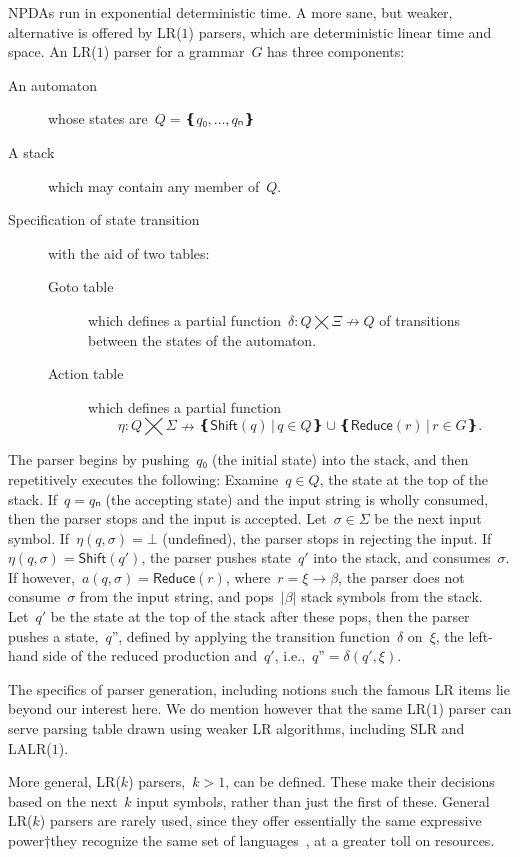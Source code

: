 NPDAs run in exponential deterministic time.
A more sane, but weaker, alternative is offered by LR($1$) parsers,
  which are deterministic linear time and space.
An LR($1$) parser for a grammar~$G$ has three components:
\begin{description}
  \item[An automaton] whose states are~$Q=❴q₀,…,qₙ❵$
  \item[A stack] which may contain any member of~$Q$.
  \item[Specification of state transition] with the aid of two tables:
        \begin{description}
          \item[Goto table] which defines a partial function~$δ:Q⨉Ξ↛Q$ of transitions
          between the states of the automaton.
          \item[Action table] which
            defines a partial function\[η:Q⨉Σ↛ ❴ \textsf{Shift}(q) \,|\, q∈Q❵ ∪ ❴\textsf{Reduce}(r) \,| \, r∈G❵.\]
        \end{description}
\end{description}
The parser begins by pushing~$q₀$ (the initial state) into the stack,
and then repetitively executes the following:
Examine~$q∈Q$, the state at the top of the stack.
If~$q=qₙ$ (the accepting state) and the input string is wholly consumed, then the parser stops and the input is accepted.
Let~$σ∈Σ$ be the next input symbol.
If~$η(q,σ)=⊥$ (undefined), the parser stops in rejecting the input.
If~$η(q,σ) = \textsf{Shift}(q')$, the parser pushes state~$q'$ into the stack, and consumes~$σ$.
If however,~$a(q,σ) = \textsf{Reduce}(r)$,
where~$r=ξ→β$, the parser does not consume~$σ$ from the input string,
  and pops~$|β|$ stack symbols from the stack.
Let~$q'$ be the state at the top of the stack after these pops, then
  the parser pushes a state,~$q”$,
  defined by applying the transition function~$δ$ on~$ξ$, the left-hand side of the reduced production and~$q'$, i.e.,~$q”=δ(q',ξ)$.

The specifics of parser generation, including notions such the famous LR items lie beyond our interest here.
We do mention however that the same LR($1$) parser can serve parsing table drawn using weaker LR algorithms, including SLR and
LALR($1$). %

More general, LR($k$) parsers,~$k>1$, can be defined. These make their
  decisions based on the next~$k$ input symbols, rather than just the first of these.
General LR($k$) parsers are rarely used, since they offer essentially
  the same expressive power†{they recognize the same set of languages~\cite{Knuth:65}}, at a greater toll on resources.

